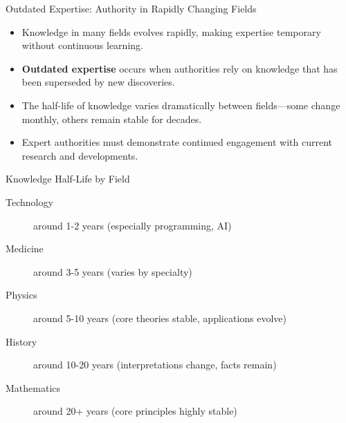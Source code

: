 \documentclass{beamer}
\begin{document}
\begin{frame}{Outdated Expertise: Authority in Rapidly Changing Fields}
    \begin{itemize}
        \item Knowledge in many fields evolves rapidly, making expertise temporary without continuous learning.
        \item \textbf{Outdated expertise} occurs when authorities rely on knowledge that has been superseded by new discoveries.
        \item The half-life of knowledge varies dramatically between fields—some change monthly, others remain stable for decades.
        \item Expert authorities must demonstrate continued engagement with current research and developments.
    \end{itemize}
    
    \begin{block}{Knowledge Half-Life by Field}
        \begin{description}
            \item[Technology] around 1-2 years (especially programming, AI)
            \item[Medicine] around 3-5 years (varies by specialty)
            \item[Physics] around 5-10 years (core theories stable, applications evolve)
            \item[History] around 10-20 years (interpretations change, facts remain)
            \item[Mathematics] around 20+ years (core principles highly stable)
        \end{description}
    \end{block}
\end{frame}
\end{document}
